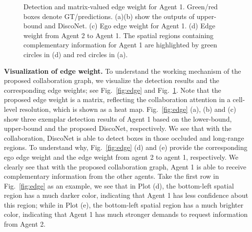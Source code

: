 \documentclass{article}
\begin{document}
\begin{figure}[t]
\centering
   \vspace{-2mm}
\centering
	\vspace{-3mm}
\caption{Detection and matrix-valued edge weight for Agent 1. Green/red boxes denote GT/predictions. (a)(b) show the outputs of upper-bound and  DiscoNet. (c) Ego edge weight for Agent 1. (d) Edge weight from Agent 2 to Agent 1. The spatial regions containing complementary information for Agent 1 are highlighted by green circles in (d) and red circles in (a).}
\label{fig:edge_weight_appendix}
	\vspace{-2mm}
\end{figure}





\textbf{Visualization of edge weight.} 
To understand the working mechanism of the proposed collaboration graph, we visualize the detection results and the corresponding edge weights; see Fig.~\ref{fig:edge} and Fig.~\ref{fig:edge_weight_appendix}. Note that the proposed edge weight is a matrix, reflecting the collaboration attention in a cell-level resolution, which is shown as a heat map. Fig.~\ref{fig:edge} (a), (b) and (c) show three exemplar detection results of  Agent 1 based on the lower-bound, upper-bound and the proposed DiscoNet, respectively. We see that with the collaboration, DiscoNet is able to detect boxes in those occluded and long-range regions. To understand why, Fig.~\ref{fig:edge} (d) and (e) provide the corresponding ego edge weight and the edge weight from agent 2 to agent 1, respectively. We clearly see that with the proposed collaboration graph, Agent 1 is able to receive complementary information from the other agents. Take the first row in Fig.~\ref{fig:edge} as an example, we see that in Plot (d), the bottom-left spatial region has a much darker color, indicating that Agent 1 has less confidence about this region; while in Plot (e), the bottom-left spatial region has a much brighter color, indicating that Agent 1 has much stronger demands to request information from Agent 2.
\end{document}
